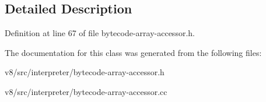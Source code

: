 \subsection{Detailed Description}


Definition at line 67 of file bytecode-\/array-\/accessor.\+h.



The documentation for this class was generated from the following files\+:\begin{DoxyCompactItemize}
\item 
v8/src/interpreter/bytecode-\/array-\/accessor.\+h\item 
v8/src/interpreter/bytecode-\/array-\/accessor.\+cc\end{DoxyCompactItemize}
